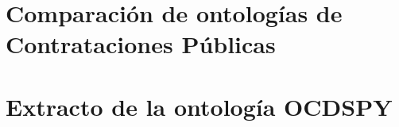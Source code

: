 \begin{appendices}
\chapter{Comparación de ontologías de Contrataciones Públicas}
\label{chap:comparaciondeOntologias}


\chapter{Extracto de la ontología OCDSPY}

\end{appendices}